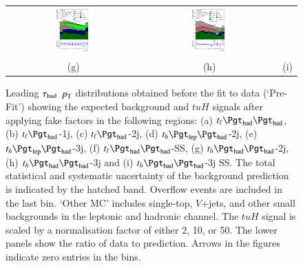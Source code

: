 \begin{figure}[H]
\begin{tabular}{@{}ccc@{}}
\includegraphics[page=1,width=0.28\textwidth]{figures/pt/tuH_reg2mtau1b3jos_log_.pdf}&
\includegraphics[page=1,width=0.28\textwidth]{figures/pt/tuH_reg2mtau1b3jss_log_.pdf}\\
(g) & (h) & (i)\\
\end{tabular}
\caption{Leading $\tau_\text{had}$ $p_{\text{T}}$  distributions obtained before the fit to data (`Pre-Fit') showing 
  the expected background and $tuH$ signals after applying fake factors in the following regions: (a) $t_{\ell}\thadhad$,
 (b) $t_{\ell}\tauhad$-1j,  (c) $t_{\ell}\tauhad$-2j, (d) $t_h\tlhad$-2j, (e) $t_h\tlhad$-3j, (f) $t_{\ell}\thadhad$-SS, (g) $t_h\thadhad$-2j, (h) $t_h\thadhad$-3j and (i) $t_h\thadhad$-3j SS.
 The total statistical and systematic uncertainty of the background prediction is indicated by the hatched band.
 Overflow events are included in the last bin. `Other MC' includes single-top, $V$+jets, and other small backgrounds in the leptonic and hadronic channel. The $tuH$ signal is scaled by a
 normalisation factor of either 2, 10, or 50.   
The lower panels show the ratio of data to prediction. Arrows in the figures indicate zero entries in the bins.}
\label{fig:taupt_prefit}
\end{figure}




